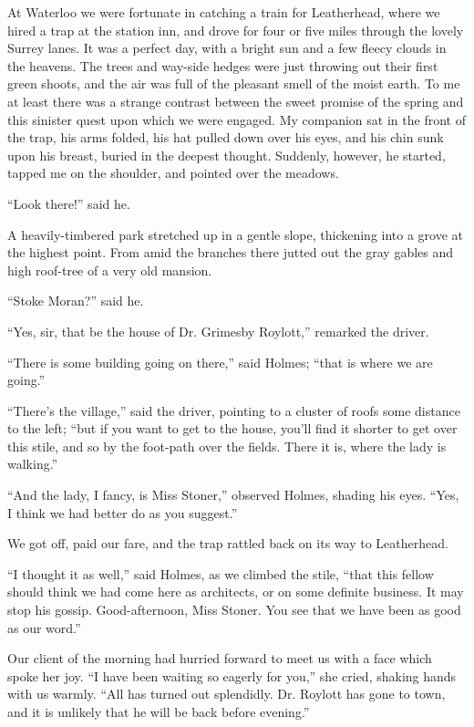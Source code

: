 At Waterloo we were fortunate in catching a train for
Leatherhead, where we hired a trap at the station inn, and
drove for four or five miles through the lovely Surrey lanes.
It was a perfect day, with a bright sun and a few fleecy clouds
in the heavens. The trees and way-side hedges were just
throwing out their first green shoots, and the air was full of
the pleasant smell of the moist earth. To me at least there
was a strange contrast between the sweet promise of the
spring and this sinister quest upon which we were engaged.
My companion sat in the front of the trap, his arms folded,
his hat pulled down over his eyes, and his chin sunk upon his
breast, buried in the deepest thought. Suddenly, however,
he started, tapped me on the shoulder, and pointed over the
meadows.

“Look there!” said he.

A heavily-timbered park stretched up in a gentle slope,
thickening into a grove at the highest point. From amid the
branches there jutted out the gray gables and high roof-tree
of a very old mansion.

“Stoke Moran?” said he.

“Yes, sir, that be the house of Dr. Grimesby Roylott,” remarked
the driver.

“There is some building going on there,” said Holmes;
“that is where we are going.”

“There’s the village,” said the driver, pointing to a cluster
of roofs some distance to the left; “but if you want to get
to the house, you’ll find it shorter to get over this stile, and so
by the foot-path over the fields. There it is, where the lady
is walking.”

“And the lady, I fancy, is Miss Stoner,” observed Holmes,
shading his eyes. “Yes, I think we had better do as you
suggest.”

We got off, paid our fare, and the trap rattled back on its
way to Leatherhead.

“I thought it as well,” said Holmes, as we climbed the
stile, “that this fellow should think we had come here as
architects, or on some definite business. It may stop his
gossip. Good-afternoon, Miss Stoner. You see that we have
been as good as our word.”

Our client of the morning had hurried forward to meet us
with a face which spoke her joy. “I have been waiting so
eagerly for you,” she cried, shaking hands with us warmly.
“All has turned out splendidly. Dr. Roylott has gone to
town, and it is unlikely that he will be back before evening.”

